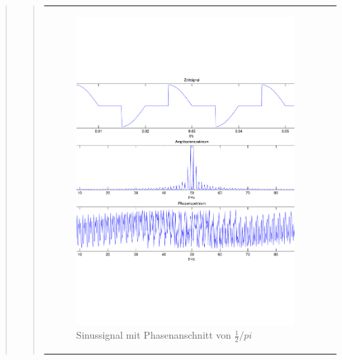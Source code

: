 \begin{quote}
\begin{quote}
\begin{center}
\begin{tabular}{ll}
            \hspace{-4em}
                \begin{minipage}{0.6\textwidth}

                    \begin{figure}[H]
                        \label{fig:}
                        \includegraphics[scale=0.3]{./Bilder/Phasenanschnitt48pi.pdf} %
                        \caption{Sinussignal mit Phasenanschnitt von $\frac{1}{2}/pi$}
                    \end{figure}

                \end{minipage}
                \begin{minipage}{0.6\textwidth}


\end{minipage}
\end{tabular}
\end{center}
\end{quote}
\end{quote}
